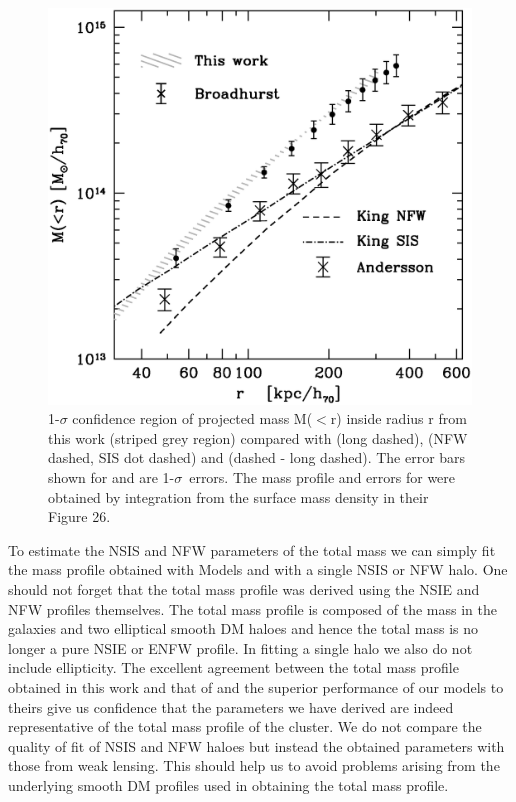 \documentclass[useAMS,usenatbib]{mn2e}
\newcounter{one}   \setcounter{one}{1}
\newcounter{two}   \setcounter{two}{2}
\begin{document}
\begin{figure}
  \centering \includegraphics[width=\columnwidth]{figs/mass_gbbs.ps}
  \caption{1-$\sigma$ confidence region of projected mass M($<$r)
  inside radius r from this work (striped grey region) compared with
  \citet{broadhurst:05} (long dashed), \citet{king:02b} (NFW dashed,
  SIS dot dashed) and \citet{andersson:04} (dashed - long dashed). The
  error bars shown for \citet{broadhurst:05} and \citet{andersson:04}
  are 1-$\sigma$~errors. The mass profile and errors for
  \citet{broadhurst:05} were obtained by integration from the surface
  mass density in their Figure 26.}
  \label{fig:mass}
\end{figure}

To estimate the NSIS and NFW parameters of the total mass we can
simply fit the mass profile obtained with Models  and
 with a single NSIS or NFW halo. One should not forget that
the total mass profile was derived using the NSIE and NFW profiles
themselves. The total mass profile is composed of the mass in the
galaxies and two elliptical smooth DM haloes and hence the total mass
is no longer a pure NSIE or ENFW profile. In fitting a single halo we
also do not include ellipticity. The excellent agreement between the
total mass profile obtained in this work and that of
\citet{broadhurst:05} and the superior performance of our models to
theirs give us confidence that the parameters we have derived are
indeed representative of the total mass profile of the cluster. We do
not compare the quality of fit of NSIS and NFW haloes but instead the
obtained parameters with those from weak lensing. This should help us
to avoid problems arising from the underlying smooth DM profiles used
in obtaining the total mass profile.
\end{document}
